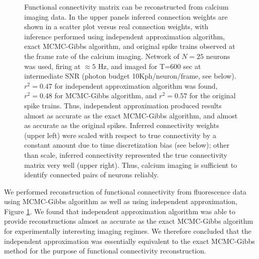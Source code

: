 \begin{figure}[h]
\caption{Functional connectivity matrix can be reconstructed from calcium imaging data.
In the upper panels inferred connection weights are shown in a scatter plot versus real connection weights, with inference performed using independent approximation algorithm, exact MCMC-Gibbs algorithm, and original spike trains observed at the frame rate of the calcium imaging. Network of $N=25$ neurons was used, firing at $\approx 5$ Hz, and imaged for T=600 sec at intermediate SNR (photon budget 10Kph/neuron/frame, see below).
$r^2=0.47$ for independent approximation algorithm was found, $r^2=0.48$ for MCMC-Gibbs algorithm, and $r^2=0.57$ for the original spike trains.
Thus, independent approximation produced results almost as accurate as the exact MCMC-Gibbs algorithm, and almost as accurate as the original spikes.
Inferred connectivity weights (upper left) were scaled with respect to true connectivity by a constant amount due to time discretization bias (see below); other than scale, inferred connectivity represented the true connectivity matrix very well (upper right).
Thus, calcium imaging is sufficient to identify connected pairs of neurons reliably.}
\label{fig:scatters}
\end{figure}


We performed reconstruction of functional connectivity from fluorescence data using MCMC-Gibbs algorithm as well as using independent approximation, Figure \ref{fig:scatters}. We found that independent approximation algorithm was able to provide reconstructions almost as accurate as the exact MCMC-Gibbs algorithm for experimentally interesting imaging regimes. We therefore concluded that the independent approximation was essentially equivalent to the exact MCMC-Gibbs method for the purpose of functional connectivity reconstruction.

